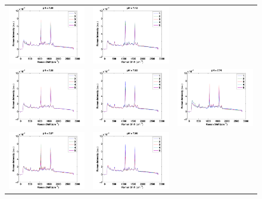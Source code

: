 \documentclass[a4paper]{article}
\begin{document}
\begin{figure}[h]
\begin{tabular}{ccc}
\includegraphics[width=.33\textwidth]{images/n5.pdf}  & 
\includegraphics[width=.33\textwidth]{images/n6.pdf}  \\
\includegraphics[width=.33\textwidth]{images/n7.pdf}  & 
\includegraphics[width=.33\textwidth]{images/n8.pdf}  &
\includegraphics[width=.33\textwidth]{images/n9.pdf}  \\ 
\includegraphics[width=.33\textwidth]{images/n10.pdf} &
\includegraphics[width=.33\textwidth]{images/n11.pdf} & 

\end{tabular}
\end{figure}
\end{document}
